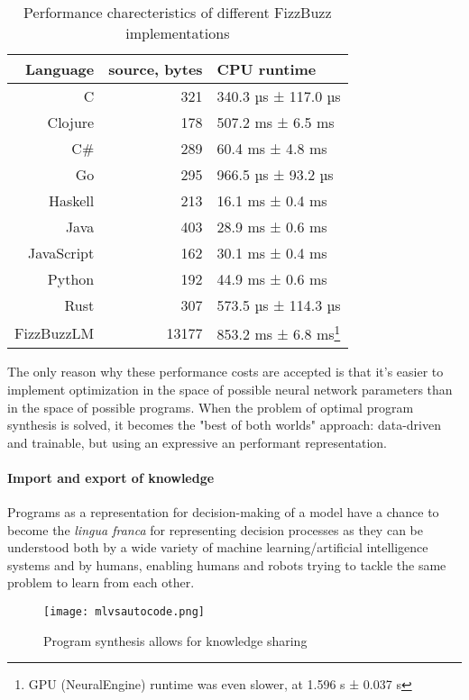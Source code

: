 \begin{table}[H]
    \centering
    \begin{tabular}{r|r|l}
         Language & source, bytes & CPU runtime \\
         \midrule
         C & 321 & 340.3 µs ± 117.0 µs \\
         Clojure & 178 & 507.2 ms ± 6.5 ms \\
         C\# & 289 & 60.4 ms ± 4.8 ms \\
         Go & 295 & 966.5 µs ±  93.2 µs \\
         Haskell & 213 & 16.1 ms ± 0.4 ms \\
         Java & 403 & 28.9 ms ± 0.6 ms \\
         JavaScript & 162 & 30.1 ms ± 0.4 ms \\
         Python & 192 & 44.9 ms ± 0.6 ms \\
         Rust & 307 & 573.5 µs ± 114.3 µs \\
         FizzBuzzLM & 13177 & 853.2 ms ± 6.8 ms\footnote{GPU (NeuralEngine) runtime was even slower, at 1.596 s ± 0.037 s}
    \end{tabular}
    \caption{Performance charecteristics of different FizzBuzz implementations}
    \label{tab:my_label}
\end{table}

The only reason why these performance costs are accepted is that it's easier to implement optimization in the space of possible neural network parameters than in the space of possible programs. 
When the problem of optimal program synthesis is solved, it becomes the "best of both worlds" approach: data-driven and trainable, but using an expressive an performant representation.
 
\paragraph{Import and export of knowledge}

Programs as a representation for decision-making of a model have a chance to become the \emph{lingua franca} \cite{samarinLinguaFranca1987} for representing decision processes as they can be understood both by a wide variety of machine learning/artificial intelligence systems and by humans, enabling humans and robots trying to tackle the same problem to learn from each other.

\begin{figure}[H]
    \centering
    \texttt{[image: mlvsautocode.png]}
    \caption{Program synthesis allows for knowledge sharing}
    \label{fig:mlvsautocode}
\end{figure}

